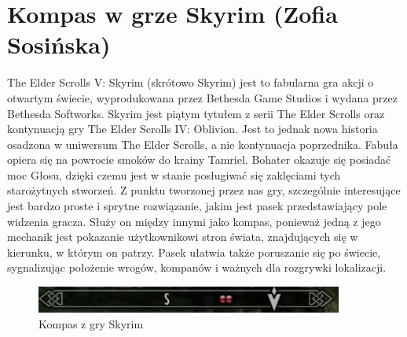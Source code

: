 \section{Kompas w grze Skyrim (Zofia Sosińska)}\label{chap:skrm}

The Elder Scrolls V: Skyrim (skrótowo Skyrim) jest to fabularna gra akcji o otwartym świecie, 
wyprodukowana przez Bethesda Game Studios i wydana przez Bethesda Softworks. Skyrim jest piątym 
tytułem z serii The Elder Scrolls oraz kontynuacją gry The Elder Scrolls IV: Oblivion. Jest to jednak 
nowa historia osadzona w uniwersum The Elder Scrolls, a nie kontynuacja poprzednika. Fabuła opiera się 
na powrocie smoków do krainy Tamriel. Bohater okazuje się posiadać moc Głosu, dzięki czemu jest w stanie 
posługiwać się zaklęciami tych starożytnych stworzeń.
Z punktu tworzonej przez nas gry, szczególnie interesujące jest  bardzo proste i sprytne rozwiązanie,
jakim jest pasek przedstawiający pole widzenia gracza. Służy on między innymi jako kompas, ponieważ 
jedną z jego mechanik jest pokazanie użytkownikowi stron świata, znajdujących się w kierunku, w którym 
on patrzy. Pasek ułatwia także poruszanie się po świecie, sygnalizując położenie wrogów, kompanów i ważnych 
dla rozgrywki lokalizacji.


	\begin{figure}[htbp]
		\centering
		\includegraphics[width=0.9\textwidth]{images/ui/compassSkyrim.png}
		\caption{Kompas z gry Skyrim}\label{fig:Fallout}
	\end{figure}

